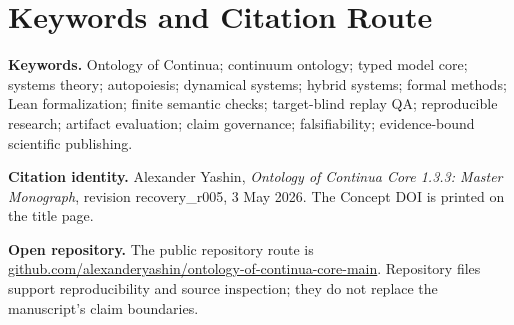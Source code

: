 \documentclass[11pt,a4paper]{article}
\begin{document}
\appendix
{}





















\clearpage
\clearpage
\section*{Keywords and Citation Route}
\noindent\textbf{Keywords.} Ontology of Continua; continuum ontology; typed model core; systems theory; autopoiesis; dynamical systems; hybrid systems; formal methods; Lean formalization; finite semantic checks; target-blind replay QA; reproducible research; artifact evaluation; claim governance; falsifiability; evidence-bound scientific publishing.

\medskip
\noindent\textbf{Citation identity.} Alexander Yashin, \emph{Ontology of Continua Core 1.3.3: Master Monograph}, revision recovery\_r005, 3 May 2026. The Concept DOI is printed on the title page.

\medskip
\noindent\textbf{Open repository.} The public repository route is \href{https://github.com/alexanderyashin/ontology-of-continua-core-main}{github.com/alexanderyashin/ontology-of-continua-core-main}. Repository files support reproducibility and source inspection; they do not replace the manuscript's claim boundaries.


\clearpage
\nocite{*}
\printbibliography[heading=bibintoc,title={Bibliography}]
\end{document}
